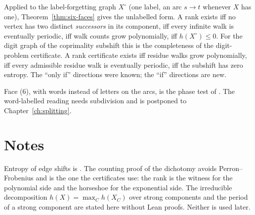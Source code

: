 Applied to the label-forgetting graph \(X^{\circ}\) (one label, an arc \(s\to t\) whenever \(X\)
has one), Theorem~\ref{thm:six-faces} gives the unlabelled form. A rank exists iff no vertex has
two distinct \emph{successors} in its component, iff every infinite walk is eventually periodic,
iff walk counts grow polynomially, iff \(h(X^{\circ})\le0\). For the digit graph of the
coprimality subshift this is the completeness of the digit-problem certificate. A rank
certificate exists iff residue walks grow polynomially, iff every admissible residue walk is
eventually periodic, iff the subshift has zero entropy. The ``only if'' directions were known;
the ``if'' directions are new.

Face (6), with words instead of letters on the arcs, is the phase test of \cite[Thm.~21]{Oda26}.
The word-labelled reading needs subdivision and is postponed to Chapter~\ref{ch:splitting}.

\section*{Notes}
Entropy of edge shifts is \cite[§4.1--4.4]{LM95}. The counting proof of the dichotomy avoids
Perron--Frobenius and is the one the certificates use: the rank is the witness for the
polynomial side and the horseshoe for the exponential side. The irreducible decomposition
\(h(X)=\max_C h(X_C)\) over strong components \cite[Thm.~4.4.4]{LM95} and the period of a
strong component \cite[§10.5]{BJG09} are stated here without Lean proofs. Neither is used later.

